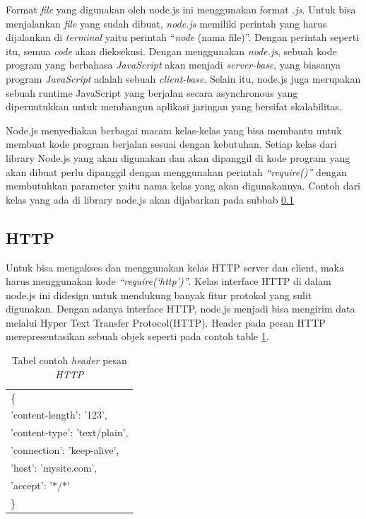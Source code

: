 Format \textit{file} yang digunakan oleh node.js ini menggunakan format \textit{.js}. Untuk bisa menjalankan \textit{file} yang sudah dibuat, \textit{node.js} memiliki perintah yang harus dijalankan di \textit{terminal} yaitu perintah ``\textit{node} (nama file)''. Dengan perintah seperti itu, semua \textit{code} akan dieksekusi. Dengan menggunakan \textit{node.js}, sebuah kode program yang berbahasa \textit{JavaScript} akan menjadi \textit{server-base}, yang biasanya program \textit{JavaScript} adalah sebuah \textit{client-base}. Selain itu, node.js juga merupakan sebuah runtime JavaScript yang berjalan secara asynchronous yang diperuntukkan untuk membangun aplikasi jaringan yang bersifat skalabilitas. 

Node.js menyediakan berbagai macam kelas-kelas yang bisa membantu untuk membuat kode program berjalan sesuai dengan kebutuhan. Setiap kelas dari library Node.js yang akan digunakan dan akan dipanggil di kode program yang akan dibuat perlu dipanggil dengan menggunakan perintah \textit{``require()''} dengan membutuhkan parameter yaitu nama kelas yang akan digunakannya. Contoh dari kelas yang ada di library node.js akan dijabarkan pada subbab \ref{http}

\subsection{HTTP}
\label{http}
Untuk bisa mengakses dan menggunakan kelas HTTP server dan client, maka harus menggunakan kode \textit{``require(`http')''}. Kelas interface HTTP di dalam node.js ini didesign untuk mendukung banyak fitur protokol yang sulit digunakan. Dengan adanya interface HTTP, node.js menjadi bisa mengirim data melalui Hyper Text Transfer Protocol(HTTP). Header pada pesan HTTP merepresentasikan sebuah objek seperti pada contoh table \ref{tab:contoh_header_pesan_http}. 

\begin{table}[H]
	\centering 
	\caption{Tabel contoh \textit{header} pesan \textit{HTTP}}
	\label{tab:contoh_header_pesan_http}
	\begin{tabular}{|p{6cm}|}
	\toprule
	\{\\
	'content-length': '123',\\
  	'content-type': 'text/plain',\\
  	'connection': 'keep-alive',\\
  	'host': 'mysite.com',\\
  	'accept': '*/*' \\
  	\}\\
	\bottomrule
\end{tabular}  
\end{table}

